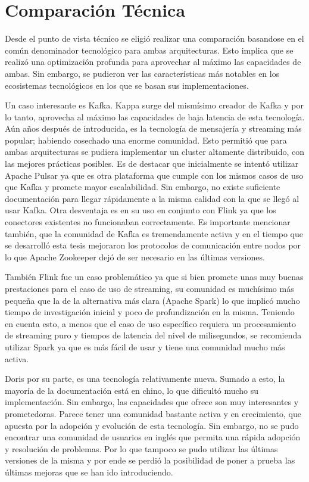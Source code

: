 \section{Comparación Técnica}

Desde el punto de vista técnico se eligió realizar una comparación basandose en el común denominador tecnológico para ambas arquitecturas.
Esto implica que se realizó una optimización profunda para aprovechar al máximo las capacidades de ambas. 
Sin embargo, se pudieron ver las características más notables en los ecosistemas tecnológicos en los que se basan sus implementaciones. 

Un caso interesante es Kafka. Kappa surge del mismísimo creador de Kafka y por lo tanto, aprovecha al máximo las capacidades de baja latencia de esta tecnología.
Aún años después de introducida, es la tecnología de mensajería y streaming más popular; habiendo cosechado una enorme comunidad. 
Esto permitió que para ambas arquitecturas se pudiera implementar un cluster altamente distribuido, con las mejores prácticas posibles. 
Es de destacar que inicialmente se intentó utilizar Apache Pulsar ya que es otra plataforma que cumple con los mismos casos de uso que Kafka y promete mayor escalabilidad. 
Sin embargo, no existe suficiente documentación para llegar rápidamente a la misma calidad con la que se llegó al usar Kafka. 
Otra desventaja es en su uso en conjunto con Flink ya que los conectores existentes no funcionaban correctamente. 
Es importante mencionar también, que la comunidad de Kafka es tremendamente activa 
y en el tiempo que se desarrolló esta tesis mejoraron los protocolos de comunicación entre nodos por lo que Apache Zookeeper dejó de ser necesario en las últimas versiones.

También Flink fue un caso problemático ya que si bien promete unas muy buenas prestaciones para el caso de uso de streaming, 
su comunidad es muchísimo más pequeña que la de la alternativa más clara (Apache Spark) lo que implicó mucho tiempo de investigación inicial y poco de profundización en la misma. 
Teniendo en cuenta esto, a menos que el caso de uso específico requiera un procesamiento de streaming puro y tiempos de latencia del nivel de milisegundos,
se recomienda utilizar Spark ya que es más fácil de usar y tiene una comunidad mucho más activa.

Doris por su parte, es una tecnología relativamente nueva. Sumado a esto, la mayoría de la documentación está en chino, lo que dificultó mucho su implementación.
Sin embargo, las capacidades que ofrece son muy interesantes y prometedoras. Parece tener una comunidad bastante activa y en crecimiento, 
que apuesta por la adopción y evolución de esta tecnología. 
Sin embargo, no se pudo encontrar una comunidad de usuarios en inglés que permita una rápida adopción y resolución de problemas. Por lo que tampoco se pudo utilizar 
las últimas versiones de la misma y por ende se perdió la posibilidad de poner a prueba las últimas mejoras que se han ido introduciendo.

